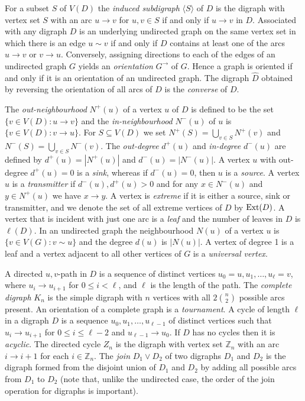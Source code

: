 \documentclass[a4paper,12pt]{article}
\theoremstyle{definition}
\newcommand{\ext}{{\rm Ext}}
\begin{document}
	For a subset $S$ of $V(D)$ the \emph{induced subdigraph} $\langle S \rangle $ of $D$ is the digraph with vertex set $S$ with an arc $u \rightarrow v$ for $u,v \in S$ if and only if $u \rightarrow v$ in $D$. Associated with any digraph $D$ is an underlying undirected graph on the same vertex set in which there is an edge $u \sim v$ if and only if $D$ contains at least one of the arcs $u \rightarrow v$ or $v \rightarrow u$. Conversely, assigning directions to each of the edges of an undirected graph $G$ yields an \emph{orientation} $G^{\rightarrow }$ of $G$. Hence a graph is oriented if and only if it is an orientation of an undirected graph. The digraph $\hat {D}$ obtained by reversing the orientation of all arcs of $D$ is the \emph{converse} of $D$.
	
	The \emph{out-neighbourhood} $N^+(u)$ of a vertex $u$ of $D$ is defined to be the set $\{ v \in V(D):u \rightarrow v\} $ and the \emph{in-neighbourhood} $N^-(u)$ of $u$ is $\{ v \in V(D) : v\rightarrow u\} $. For $S \subseteq V(D)$ we set $N^+(S) = \bigcup _{v\in S}N^+(v)$ and $N^-(S) = \bigcup _{v\in S}N^-(v)$. The \emph{out-degree} $d^+(u)$ and \emph{in-degree} $d^-(u)$ are defined by $d^+(u) = |N^+(u)|$ and $d^-(u) = |N^-(u)|$. A vertex $u$ with out-degree $d^+(u) = 0$ is a \emph{sink}, whereas if $d^-(u) = 0$, then $u$ is a \emph{source}. A vertex $u$ is a \emph{transmitter} if $d^-(u),d^+(u) > 0$ and for any $x \in N^-(u)$ and $y \in N^+(u)$ we have $x \rightarrow y$. A vertex is \emph{extreme} if it is either a source, sink or transmitter, and we denote the set of all extreme vertices of $D$ by $\ext (D)$. A vertex that is incident with just one arc is a \emph{leaf} and the number of leaves in $D$ is $\ell (D)$. In an undirected graph the neighbourhood $N(u)$ of a vertex $u$ is $\{ v \in V(G):v \sim u\} $ and the degree $d(u)$ is $|N(u)|$. A vertex of degree 1 is a leaf and a vertex adjacent to all other vertices of $G$ is a \emph{universal vertex}. 
	
	A directed $u,v$-path in $D$ is a sequence of distinct vertices $u_0 = u,u_1,\ldots ,u_{\ell }=v$, where $u_i \rightarrow u_{i+1}$ for $0 \leq i < \ell $, and $\ell $ is the length of the path. The \emph{complete digraph} $K_n$ is the simple digraph with $n$ vertices with all $2\binom{n}{2}$ possible arcs present. An orientation of a complete graph is a \emph{tournament}. A cycle of length $\ell $ in a digraph $D$ is a sequence $u_0,u_1,\ldots ,u_{\ell -1}$ of distinct vertices such that $u_i \rightarrow u_{i+1}$ for $0 \leq i \leq \ell -2$ and $u_{\ell -1} \rightarrow u_0$. If $D$ has no cycles then it is \emph{acyclic}. The directed cycle $Z_n$ is the digraph with vertex set $\mathbb{Z}_n$ with an arc $i \rightarrow i+1$ for each $i \in \mathbb{Z}_n$. The \emph{join} $D_1 \vee D_2$ of two digraphs $D_1$ and $D_2$ is the digraph formed from the disjoint union of $D_1$ and $D_2$ by adding all possible arcs from $D_1$ to $D_2$ (note that, unlike the undirected case, the order of the join operation for digraphs is important).
	
\end{document}
